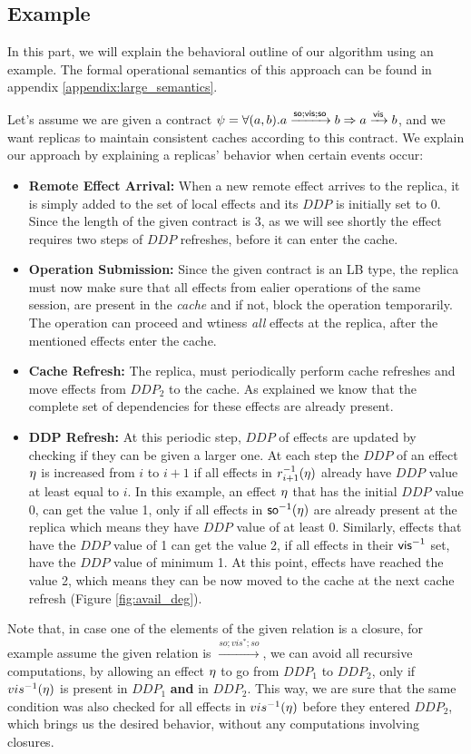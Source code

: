 \subsection{Example}

In this part, we will explain the behavioral outline of our algorithm
using an example. The formal operational semantics of this approach can be
found in appendix \ref{appendix:large_semantics}.

Let's assume we are given a contract $\psi=\forall (a,b). a
\xrightarrow{{\normalfont \textsf{so}};{\normalfont \textsf{vis}};{\normalfont \textsf{so}}}b \Rightarrow a \xrightarrow{{\normalfont \textsf{vis}}} b$, and
we want replicas to maintain consistent caches according to this
contract. We explain our approach by
explaining a replicas' behavior when certain events occur: 
\begin{itemize}
\item {\bf Remote Effect Arrival:} When a new remote effect arrives to the
replica, it is simply added to the set of local effects and 
its $DDP$ is initially set to 0. Since the length of the
given contract is 3, as we will see shortly the effect requires two
steps
of $DDP$ refreshes, before it can enter the cache.
\item {\bf Operation Submission: } Since the given contract is an LB
type, the replica must now make sure that all effects from ealier
operations of the same session, are present in the \emph{cache} and if
not, 
block the operation temporarily. The operation can proceed and
wtiness \emph{all} effects at the replica, after the mentioned effects enter
the cache.
\item {\bf Cache Refresh: } The replica, must periodically perform 
cache refreshes and move effects from $DDP_2$ to the cache. As explained
we know that the complete set of dependencies for these effects are
already present. 
\item {\bf DDP Refresh: } At this periodic step, $DDP$ of effects are
updated by checking if they can be given a larger one. 
At each step the $DDP$ of an effect $\eta$ is increased from $i$ to $i+1$ if
all effects in $r_{i+1}^{-1}(\eta)$ already have $DDP$ value at least equal to $i$.
In this example, an effect $\eta$ that has the initial $DDP$ value 0, can get
the value 1, only if all effects in  ${\normalfont \textsf{so}}^{-1}(\eta)$ are already
present at the replica which means they have $DDP$ value of at least 0.
Similarly, effects that have the $DDP$ value of 1 can get the value 2,
if all effects in their ${\normalfont \textsf{vis}}^{-1}$ set, have the $DDP$ value of
minimum 1. At this point, effects have reached the value 2, which means
they can be now moved to the cache at the next cache refresh (Figure
\ref{fig:avail_deg}).
\end{itemize}

Note that, in case one of the elements of the given relation is a
closure, for example assume the given relation is $\xrightarrow{so;vis^*;so}$,
we can avoid all recursive computations, by allowing an effect $\eta$
to go from $DDP_1$ to $DDP_2$, only if $vis^{-1}(\eta)$ is present in
$DDP_1$ {\bf and} in $DDP_2$. This way, we are sure that the same
condition was also checked for all effects in $vis^{-1}(\eta)$ before they
entered $DDP_2$, which brings us the desired behavior, without any
computations involving closures.




